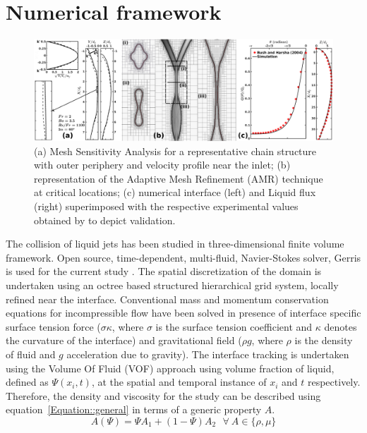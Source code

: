 \documentclass{jfm}
\begin{document}
\section{Numerical framework}
\begin{figure}
	\centering
	\includegraphics[width=\linewidth]{Figure2}
	\caption{(a) Mesh Sensitivity Analysis for a representative chain structure with outer periphery and velocity profile near the inlet; (b) representation of the Adaptive Mesh Refinement (AMR) technique at critical locations; (c) numerical interface (left) and Liquid flux (right) superimposed with the respective experimental values obtained by \cite{bush2004collision} to depict validation.}
	\label{Figure::gisetal}%
\end{figure}
The collision of liquid jets has been studied in three-dimensional finite volume framework. Open source, time-dependent, multi-fluid, Navier-Stokes solver, Gerris is used for the current study \citep{Popinet2003}. The spatial discretization of the domain is undertaken using an octree based structured hierarchical grid system, locally refined near the interface. Conventional mass and momentum conservation equations for incompressible flow have been solved in presence of interface specific surface tension force ($\sigma \kappa$, where $\sigma$ is the surface tension coefficient and $\kappa$ denotes the curvature of the interface) and gravitational field ($\rho g$, where $\rho$ is the density of fluid and $g$ acceleration due to gravity). The interface tracking is undertaken using the Volume Of Fluid (VOF) approach using volume fraction of liquid, defined as $\Psi(x_i, t)$, at the spatial and temporal instance of $x_i$ and $t$ respectively. Therefore, the density and viscosity for the study can be described using equation~\ref{Equation::general} in terms of a generic property $A$.
\begin{equation} \label{Equation::general}
A (\Psi) = \Psi A_1 + (1-\Psi)A_2 \: \: \:  \forall  \: A \in \{\rho, \mu\}
\end{equation}
\end{document}
